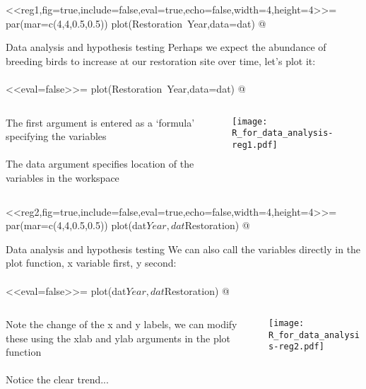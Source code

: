 \documentclass[xcolor=svgnames]{beamer}
\begin{document}
<<reg1,fig=true,include=false,eval=true,echo=false,width=4,height=4>>=
par(mar=c(4,4,0.5,0.5))
plot(Restoration~Year,data=dat)
@

\begin{frame}[fragile]{Data analysis and hypothesis testing}
Perhaps we expect the abundance of breeding birds to increase at our restoration site over time, let's plot it:\\~\\
<<eval=false>>=
plot(Restoration~Year,data=dat)
@
\vspace{-0.13in}
\pause
\begin{columns}
\begin{column}{0.5\textwidth}
The first argument is entered as a `formula' specifying the variables\\~\\
The data argument specifies location of the variables in the workspace
\end{column}
\begin{column}{0.5\textwidth}
\begin{center}
\texttt{[image: R\_for\_data\_analysis-reg1.pdf]}
\end{center}
\end{column}
\end{columns}
\end{frame}

<<reg2,fig=true,include=false,eval=true,echo=false,width=4,height=4>>=
par(mar=c(4,4,0.5,0.5))
plot(dat$Year,dat$Restoration)
@

\begin{frame}[fragile]{Data analysis and hypothesis testing}
We can also call the variables directly in the plot function, x variable first, y second:\\~\\
<<eval=false>>=
plot(dat$Year,dat$Restoration)
@
\vspace{-0.13in}
\begin{columns}
\begin{column}{0.5\textwidth}
Note the change of the x and y labels, we can modify these using the xlab and ylab arguments in the plot function\\~\\
Notice the clear trend...
\end{column}
\begin{column}{0.5\textwidth}
\begin{center}
\texttt{[image: R\_for\_data\_analysis-reg2.pdf]}
\end{center}
\end{column}
\end{columns}
\end{frame}
\end{document}
